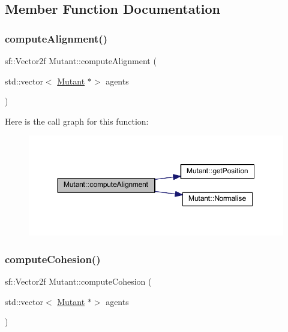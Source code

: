 \subsection{Member Function Documentation}
\mbox{\label{class_mutant_a1c6dbda519e0d1fa4013478f0337ed96}} 
\subsubsection{\texorpdfstring{compute\+Alignment()}{computeAlignment()}}
{\footnotesize\ttfamily sf\+::\+Vector2f Mutant\+::compute\+Alignment (\begin{DoxyParamCaption}\item[{std\+::vector$<$ \hyperlink{class_mutant}{Mutant} $\ast$$>$}]{agents }\end{DoxyParamCaption})}

Here is the call graph for this function\+:
\nopagebreak
\begin{figure}[H]
\begin{center}
\leavevmode
\includegraphics[width=350pt]{class_mutant_a1c6dbda519e0d1fa4013478f0337ed96_cgraph}
\end{center}
\end{figure}
\mbox{\label{class_mutant_ab6daf2a25a5a96ccc672ef00d3aa90d4}} 
\subsubsection{\texorpdfstring{compute\+Cohesion()}{computeCohesion()}}
{\footnotesize\ttfamily sf\+::\+Vector2f Mutant\+::compute\+Cohesion (\begin{DoxyParamCaption}\item[{std\+::vector$<$ \hyperlink{class_mutant}{Mutant} $\ast$$>$}]{agents }\end{DoxyParamCaption})}

